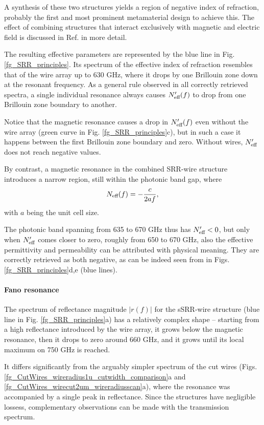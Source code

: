 A synthesis of these two structures yields a region of negative index of refraction, probably the first \cite{pendry2000negative} and most prominent metamaterial design to achieve this. The effect of combining structures that interact exclusively with magnetic and electric field is discussed in Ref. \cite{koschny2004effective} in more detail.

The resulting effective parameters are represented by the blue line in Fig. \ref{fg_SRR_principles}. Its spectrum of the effective index of refraction resembles that of the wire array up to 630 GHz, where it drops by one Brillouin zone down at the resonant frequency.
As a general rule observed in all correctly retrieved spectra, a single individual resonance always causes $N_{\text{eff} }'(f)$ to drop from one Brillouin zone boundary to another. 

Notice that the magnetic resonance causes a drop in $N_{\text{eff} }'(f)$ even without the wire array (green curve in Fig. \ref{fg_SRR_principles}c), but in such a case it happens between the first Brillouin zone boundary and zero. Without wires, $N_{\text{eff} }'$ does not reach negative values.

By contrast, a magnetic resonance in the combined SRR-wire structure introduces a narrow region, still within the photonic band gap, where 
\begin{equation} N_{\text{eff} }(f) = -\frac{c}{2 a f}, \label{eq_BZN2}\end{equation}
with $a$ being the unit cell size.	

The photonic band spanning from 635 to 670 GHz thus has $N_{\text{eff} }'<0$, but only when $N_{\text{eff} }'$ comes closer to zero, roughly from 650 to 670 GHz, also the effective permittivity and permeability can be attributed with physical meaning. They are correctly retrieved as both negative, as can be indeed seen from in Figs. \ref{fg_SRR_principles}d,e (blue lines).

\paragraph{Fano resonance} %
The spectrum of reflectance magnitude $|r(f)|$ for the sSRR-wire structure (blue line in Fig. \ref{fg_SRR_principles}a) has a relatively complex shape -- starting from a high reflectance introduced by the wire array, it grows below the magnetic resonance, then it drops to zero around 660 GHz, and it grows until its local maximum on 750 GHz is reached.

It differs significantly from the arguably simpler spectrum of the cut wires (Figs. \ref{fg_CutWires_wireradius1u_cutwidth_comparison}a and \ref{fg_CutWires_wirecut2um_wireradiusscan}a), where the resonance was accompanied by a single peak in reflectance. Since the structures have negligible lossess, complementary observations can be made with the transmission spectrum.

